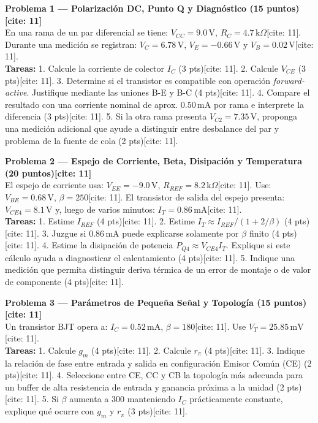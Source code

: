 \documentclass[11pt, a4paper]{article}
\begin{document}
\vspace{0.3cm}
\noindent \textbf{Problema 1 — Polarización DC, Punto Q y Diagnóstico (15 puntos)[cite: 11]} \\
En una rama de un par diferencial se tiene: $V_{CC}=9.0\,\text{V}$, $R_C=4.7\,\text{k}\Omega$[cite: 11]. Durante una medición se registran: $V_C=6.78\,\text{V}$, $V_E=-0.66\,\text{V}$ y $V_B=0.02\,\text{V}$[cite: 11]. \\
\textbf{Tareas:}
1. Calcule la corriente de colector $I_C$ (3 pts)[cite: 11].
2. Calcule $V_{CE}$ (3 pts)[cite: 11].
3. Determine si el transistor es compatible con operación \textit{forward-active}. Justifique mediante las uniones B-E y B-C (4 pts)[cite: 11].
4. Compare el resultado con una corriente nominal de aprox. $0.50\,\text{mA}$ por rama e interprete la diferencia (3 pts)[cite: 11].
5. Si la otra rama presenta $V_{C2}=7.35\,\text{V}$, proponga una medición adicional que ayude a distinguir entre desbalance del par y problema de la fuente de cola (2 pts)[cite: 11].

\noindent \textbf{Problema 2 — Espejo de Corriente, Beta, Disipación y Temperatura (20 puntos)[cite: 11]} \\
El espejo de corriente usa: $V_{EE}=-9.0\,\text{V}$, $R_{REF}=8.2\,\text{k}\Omega$[cite: 11]. Use: $V_{BE}=0.68\,\text{V}$, $\beta=250$[cite: 11]. El transistor de salida del espejo presenta: $V_{CE4}=8.1\,\text{V}$ y, luego de varios minutos: $I_T=0.86\,\text{mA}$[cite: 11]. \\
\textbf{Tareas:}
1. Estime $I_{REF}$ (4 pts)[cite: 11].
2. Estime $I_T \approx I_{REF} / (1 + 2/\beta)$ (4 pts)[cite: 11].
3. Juzgue si $0.86\,\text{mA}$ puede explicarse solamente por $\beta$ finito (4 pts)[cite: 11].
4. Estime la disipación de potencia $P_{Q4} \approx V_{CE4} I_T$. Explique si este cálculo ayuda a diagnosticar el calentamiento (4 pts)[cite: 11].
5. Indique una medición que permita distinguir deriva térmica de un error de montaje o de valor de componente (4 pts)[cite: 11].

\newpage
\noindent \textbf{Problema 3 — Parámetros de Pequeña Señal y Topología (15 puntos)[cite: 11]} \\
Un transistor BJT opera a: $I_C=0.52\,\text{mA}$, $\beta=180$[cite: 11]. Use $V_T=25.85\,\text{mV}$[cite: 11]. \\
\textbf{Tareas:}
1. Calcule $g_m$ (4 pts)[cite: 11].
2. Calcule $r_\pi$ (4 pts)[cite: 11].
3. Indique la relación de fase entre entrada y salida en configuración Emisor Común (CE) (2 pts)[cite: 11].
4. Seleccione entre CE, CC y CB la topología más adecuada para un buffer de alta resistencia de entrada y ganancia próxima a la unidad (2 pts)[cite: 11].
5. Si $\beta$ aumenta a 300 manteniendo $I_C$ prácticamente constante, explique qué ocurre con $g_m$ y $r_\pi$ (3 pts)[cite: 11].
\end{document}
